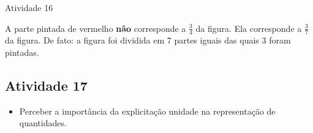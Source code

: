 \begin{multicols}{2}
\vspace{.1cm}



\begin{resposta*}{Atividade 16}

  A parte pintada de vermelho   {\bf não}   corresponde a   $\frac{3}{4}$ da figura. Ela corresponde a   $\frac{3}{7}$ da figura. De fato: a figura foi dividida em   $7$ partes iguais das quais   $3$ foram pintadas.

\end{resposta*}



\subsection{Atividade 17}



  \vspace{.1cm}

\begin{itemize} %
    \item       Perceber a importância da explicitação unidade na representação de quantidades.
\end{itemize} %


  \vspace{.1cm}

  \vspace{.1cm}


\end{multicols}
